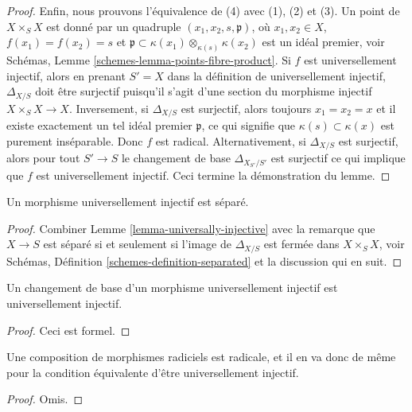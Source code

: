 \begin{proof}
\medskip\noindent
Enfin, nous prouvons l'équivalence de (4) avec (1),
(2) et (3). Un point de $X \times_S X$ est
donné par un quadruple $(x_1, x_2, s, \mathfrak p)$, où $x_1, x_2 \in X$,
$f(x_1) = f(x_2) = s$ et $\mathfrak p \subset \kappa(x_1) \otimes_{\kappa(s)} \kappa(x_2)$
est un idéal premier, voir Schémas, Lemme \ref{schemes-lemma-points-fibre-product}.
Si $f$
est universellement injectif, alors en prenant
$S'=X$ dans la définition
de universellement injectif, $\Delta_{X/S}$ doit être
surjectif puisqu'il s'agit d'une section du morphisme
injectif
$X \times_S X  \longrightarrow X$. Inversement, si $\Delta_{X/S}$
est surjectif,
alors toujours $x_1 = x_2 = x$ et il existe exactement un tel idéal
premier $\mathfrak p$, ce qui signifie que $\kappa(s) \subset \kappa(x)$ est purement
inséparable. Donc $f$ est radical.
Alternativement, si $\Delta_{X/S}$
est surjectif, alors pour tout $S' \to S$
le changement de base $\Delta_{X_{S'}/S'}$
est surjectif ce qui implique que $f$ est universellement
injectif. Ceci termine la démonstration du lemme.
\end{proof}

\begin{lemma}
\label{lemma-universally-injective-separated}
Un morphisme universellement injectif est séparé.
\end{lemma}

\begin{proof}
Combiner
Lemme \ref{lemma-universally-injective} avec la remarque
que $X \to S$ est séparé si et seulement si l'image
de $\Delta_{X/S}$ est fermée dans $X \times_S X$,
voir Schémas, Définition \ref{schemes-definition-separated} et la
discussion qui en suit.
\end{proof}

\begin{lemma}
\label{lemma-base-change-universally-injective}
Un changement de base d'un morphisme universellement injectif est universellement injectif.
\end{lemma}

\begin{proof}
Ceci est formel.
\end{proof}

\begin{lemma}
\label{lemma-composition-universally-injective}
Une composition de morphismes radiciels est radicale, et il en va donc de même
pour la condition équivalente d'être universellement injectif.
\end{lemma}

\begin{proof}
Omis.
\end{proof}









